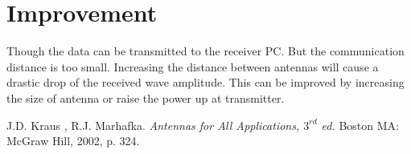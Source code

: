 \documentclass[12pt,a4paper]{report}
\begin{document}
\section{Improvement}
Though the data can be transmitted to the receiver PC. But the communication distance is too small. Increasing the distance between antennas will cause a drastic drop of the received wave amplitude.
This can be improved by increasing the size of antenna or raise the power up at transmitter. 


\begin{thebibliography}{99}

    J.D. Kraus , R.J. Marhafka.
    \textit{Antennas for All Applications, $3^{rd}$ ed.}
    Boston MA: McGraw Hill, 2002, p. 324.


\end{thebibliography}
    
\end{document}
